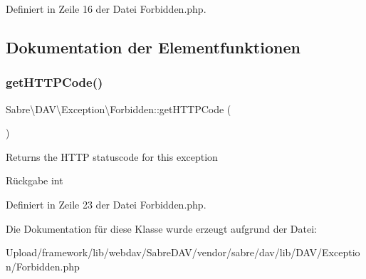 Definiert in Zeile 16 der Datei Forbidden.\+php.



\subsection{Dokumentation der Elementfunktionen}
\mbox{\label{class_sabre_1_1_d_a_v_1_1_exception_1_1_forbidden_a27075928ac99f75d1db0a95001eceb91}} 
\subsubsection{\texorpdfstring{get\+H\+T\+T\+P\+Code()}{getHTTPCode()}}
{\footnotesize\ttfamily Sabre\textbackslash{}\+D\+A\+V\textbackslash{}\+Exception\textbackslash{}\+Forbidden\+::get\+H\+T\+T\+P\+Code (\begin{DoxyParamCaption}{ }\end{DoxyParamCaption})}

Returns the H\+T\+TP statuscode for this exception

\begin{DoxyReturn}{Rückgabe}
int 
\end{DoxyReturn}


Definiert in Zeile 23 der Datei Forbidden.\+php.



Die Dokumentation für diese Klasse wurde erzeugt aufgrund der Datei\+:\begin{DoxyCompactItemize}
\item 
Upload/framework/lib/webdav/\+Sabre\+D\+A\+V/vendor/sabre/dav/lib/\+D\+A\+V/\+Exception/Forbidden.\+php\end{DoxyCompactItemize}
